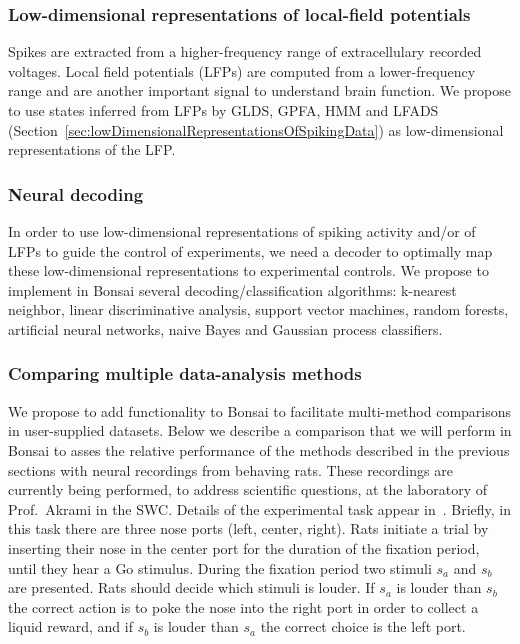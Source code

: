 \documentclass[a4paper,11point]{article}
\begin{document}
\subsubsection{Low-dimensional representations of local-field potentials}
\label{sec:lowDimensionalRepresentationsOfLFPs}

Spikes are extracted from a higher-frequency range of extracellulary recorded
voltages. Local field potentials (LFPs) are computed from a lower-frequency
range and are another important signal to understand brain function. We propose
to use states inferred from LFPs by GLDS, GPFA, HMM and LFADS
(Section~\ref{sec:lowDimensionalRepresentationsOfSpikingData}) as
low-dimensional representations of the LFP.

\subsubsection{Neural decoding}
\label{sec:neuralDecoding}

In order to use low-dimensional representations of spiking activity and/or of
LFPs to guide the control of experiments, we need a decoder to optimally map
these low-dimensional representations to experimental controls.
%
We propose to implement in Bonsai several decoding/classification algorithms:
k-nearest neighbor, linear discriminative analysis, support vector machines,
random forests, artificial neural networks, naive Bayes and Gaussian process
classifiers.

\subsubsection{Comparing multiple data-analysis methods}
\label{sec:comparisonOfMultipleMethods}

We propose to add functionality to Bonsai to facilitate multi-method
comparisons in user-supplied datasets. Below we describe a comparison that we
will perform in Bonsai to asses the relative performance of the methods
described in the previous sections with neural recordings from behaving rats.
These recordings are currently being performed, to address scientific questions,
at the laboratory of Prof.~Akrami in the SWC.
%
Details of the experimental task appear in~\citet{akramiEtAl18}.
%
Briefly, in this task there are three nose ports (left, center, right). Rats
initiate a trial by inserting their nose in the center port for the duration of
the fixation period, until they hear a Go stimulus. During the fixation period
two stimuli $s_a$ and $s_b$ are presented. Rats should decide which stimuli is
louder. If $s_a$ is louder than $s_b$ the correct action is to poke the nose
into the right port in order to collect a liquid reward, and if $s_b$ is louder
than $s_a$ the correct choice is the left port.
\end{document}
